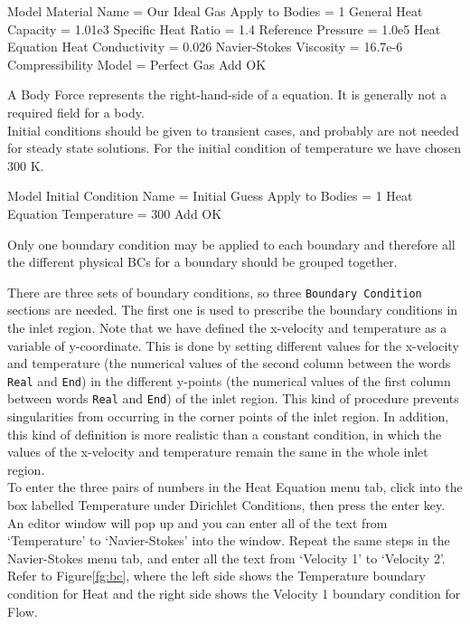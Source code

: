 \ttbegin
Model
  Material
   Name = Our Ideal Gas
    Apply to Bodies = 1 
    General
      Heat Capacity = 1.01e3
      Specific Heat Ratio = 1.4
      Reference Pressure = 1.0e5
    Heat Equation
      Heat Conductivity = 0.026
    Navier-Stokes
       Viscosity = 16.7e-6
       Compressibility Model = Perfect Gas
    Add
    OK
\ttend

A Body Force represents the right-hand-side of a equation. It is generally not a required field for a body.\\

Initial conditions should be given to transient cases, and probably are not needed for steady state solutions.  For the initial condition of temperature we have chosen 300 K.

\ttbegin
Model
  Initial Condition
    Name = Initial Guess
    Apply to Bodies = 1 
    Heat Equation
      Temperature = 300
    Add 
    OK
\ttend

Only one boundary condition may be applied to each boundary and therefore all the different physical BCs for a boundary should be grouped together. 

There are three sets of boundary conditions, so three {\tt Boundary Condition} sections are needed. The first one is used to prescribe the boundary conditions in the inlet region. Note that we have defined the x-velocity and temperature as a variable of y-coordinate.  This is done by setting different values for the x-velocity and temperature (the numerical values of the second column between the words {\tt Real} and {\tt End}) in the different y-points (the numerical values of the first column between words {\tt Real} and {\tt End}) of the inlet region. This kind of procedure prevents singularities from occurring in the corner points of the inlet region. In addition, this kind of definition is more realistic than a constant condition, in which the values of the x-velocity and temperature remain the same in the whole inlet region.\\

To enter the three pairs of numbers in the Heat Equation menu tab, click into the box labelled Temperature under Dirichlet Conditions, then press the enter key.  An editor window will pop up and you can enter all of the text from `Temperature' to `Navier-Stokes' into the window.  Repeat the same steps in the Navier-Stokes menu tab, and enter all the text from `Velocity 1' to `Velocity 2'.    Refer to Figure\ref{fg:bc}, where the left side shows the Temperature boundary condition for Heat and the right side shows the Velocity 1 boundary condition for Flow.

